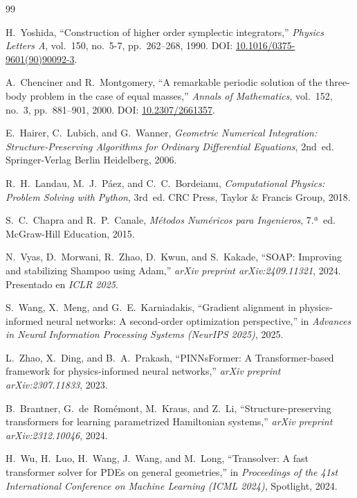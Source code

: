 \documentclass[11pt,a4paper]{article}
\begin{document}
\begin{thebibliography}{99}

H.~Yoshida, ``Construction of higher order symplectic integrators,'' \emph{Physics Letters A}, vol.~150, no.~5-7, pp.~262--268, 1990. DOI: \href{https://doi.org/10.1016/0375-9601(90)90092-3}{10.1016/0375-9601(90)90092-3}.

A.~Chenciner and R.~Montgomery, ``A remarkable periodic solution of the three-body problem in the case of equal masses,'' \emph{Annals of Mathematics}, vol.~152, no.~3, pp.~881--901, 2000. DOI: \href{https://doi.org/10.2307/2661357}{10.2307/2661357}.

E.~Hairer, C.~Lubich, and G.~Wanner, \emph{Geometric Numerical Integration: Structure-Preserving Algorithms for Ordinary Differential Equations}, 2nd~ed. Springer-Verlag Berlin Heidelberg, 2006.

R.~H.~Landau, M.~J.~Páez, and C.~C.~Bordeianu, \emph{Computational Physics: Problem Solving with Python}, 3rd~ed. CRC Press, Taylor \& Francis Group, 2018.

S.~C.~Chapra and R.~P.~Canale, \emph{Métodos Numéricos para Ingenieros}, 7.ª~ed. McGraw-Hill Education, 2015.

N.~Vyas, D.~Morwani, R.~Zhao, D.~Kwun, and S.~Kakade, ``SOAP: Improving and stabilizing Shampoo using Adam,'' \emph{arXiv preprint arXiv:2409.11321}, 2024. Presentado en \emph{ICLR 2025}.

S.~Wang, X.~Meng, and G.~E.~Karniadakis, ``Gradient alignment in physics-informed neural networks: A second-order optimization perspective,'' in \emph{Advances in Neural Information Processing Systems (NeurIPS 2025)}, 2025.

L.~Zhao, X.~Ding, and B.~A.~Prakash, ``PINNsFormer: A Transformer-based framework for physics-informed neural networks,'' \emph{arXiv preprint arXiv:2307.11833}, 2023.

B.~Brantner, G.~de~Romémont, M.~Kraus, and Z.~Li, ``Structure-preserving transformers for learning parametrized Hamiltonian systems,'' \emph{arXiv preprint arXiv:2312.10046}, 2024.

H.~Wu, H.~Luo, H.~Wang, J.~Wang, and M.~Long, ``Transolver: A fast transformer solver for PDEs on general geometries,'' in \emph{Proceedings of the 41st International Conference on Machine Learning (ICML 2024)}, Spotlight, 2024.


\end{thebibliography}
\end{document}
